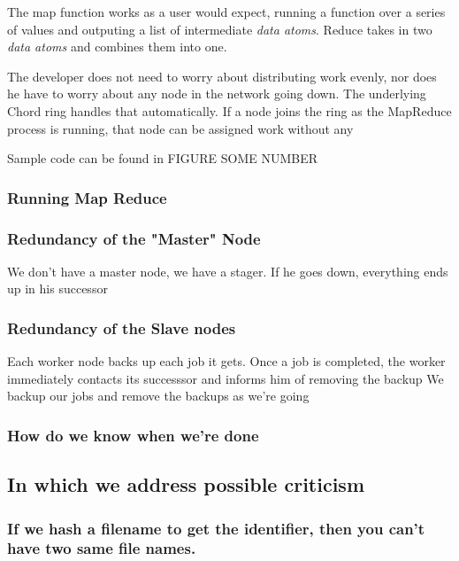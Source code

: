 \documentclass[conference, compsocconf, letterpaper]{IEEEtran}
\begin{document}
The map function works as a user would expect, running a function over a series of values and outputing a list of intermediate \emph{data atoms}.  Reduce takes in two \emph{data atoms} and combines them into one.

The developer does not need to worry about distributing work evenly, nor does he have to worry about any node in the network going down.  The underlying Chord ring handles that automatically.  If a node joins the ring as the MapReduce process is running, that node can be assigned work without any  


Sample code can be found in FIGURE SOME NUMBER





\subsubsection{Running Map Reduce}

\subsubsection{Redundancy of the "Master" Node}
We don't have a master node, we have a stager.  If he goes down, everything ends up in his successor



\subsubsection{Redundancy of the Slave nodes}
Each worker node backs up each job it gets.  Once a job is completed, the worker immediately contacts its successsor and informs him of removing the backup
We backup our jobs and remove the backups as we're going

\subsubsection{How do we know when we're done}


\subsection{In which we address possible criticism}


\subsubsection{If we hash a filename to get the identifier, then you can't have two same file names.}
\end{document}
